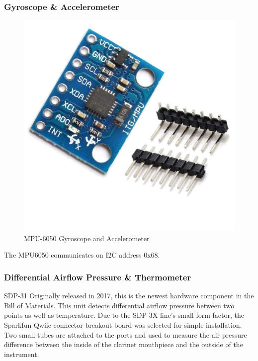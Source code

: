\subsubsection{Gyroscope \& Accelerometer}

\begin{center}
    \begin{figure}
        \centering
        \includegraphics[scale=0.2]{diagrams/oem/6050.jpg}
        \caption{MPU-6050 Gyroscope and Accelerometer}
        \label{fig:6050}
    \end{figure}
\end{center}

The MPU6050 communicates on I2C address 0x68.

\subsubsection{Differential Airflow Pressure \& Thermometer}

SDP-31
Originally released in 2017, this is the newest hardware component in the Bill of Materials. This unit detects differential airflow pressure between two points as well as temperature. Due to the SDP-3X line’s small form factor, the Sparkfun Qwiic connector breakout board was selected for simple installation. Two small tubes are attached to the ports and used to measure the air pressure difference between the inside of the clarinet mouthpiece and the outside of the instrument.


